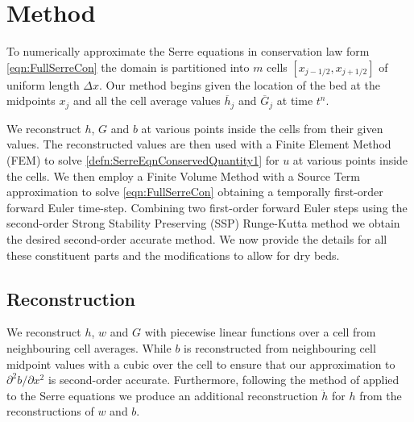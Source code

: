 \documentclass[times]{elsarticle}
\begin{document}
\section{Method}
To numerically approximate the Serre equations in conservation law form \eqref{eqn:FullSerreCon} the domain is partitioned into $m$ cells $\left[x_{j-1/2},x_{j+1/2}\right]$ of uniform length $\Delta x$. Our method begins given the location of the bed at the midpoints $x_j$ and all the cell average values $\overline{h}_j$ and $\overline{G}_j$  at time $t^n$.

We reconstruct $h$, $G$ and $b$ at various points inside the cells from their given values. The reconstructed values are then used with a Finite Element Method (FEM) to solve \eqref{defn:SerreEqnConservedQuantity1} for $u$ at various points inside the cells. We then employ a Finite Volume Method with a Source Term approximation to solve \eqref{eqn:FullSerreCon} obtaining a temporally first-order forward Euler time-step. Combining two first-order forward Euler steps using the second-order Strong Stability Preserving (SSP) Runge-Kutta method \cite{Gottlieb-etal-2003-89} we obtain the desired second-order accurate method. We now provide the details for all these constituent parts and the modifications to allow for dry beds.  

\subsection{Reconstruction}
We reconstruct $h$, $w$ and $G$ with piecewise linear functions over a cell from neighbouring cell averages. While $b$ is reconstructed from neighbouring cell midpoint values with a cubic over the cell to ensure that our approximation to $\partial^2 b / \partial x^2$ is second-order accurate. Furthermore, following the method of \citet{Klein-etal-2004-2050}  applied to the Serre equations \cite{Pitt-J-2014} we produce an additional reconstruction $\ddot{h}$ for $h$ from the reconstructions of $w$ and $b$. 
\end{document}
